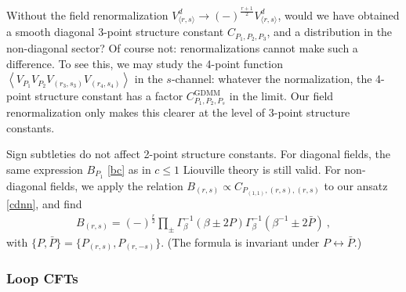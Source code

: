 \documentclass[12pt, a4paper]{article}
\theoremstyle{break}
\begin{document}
Without the field renormalization $V^d_{\langle r,s\rangle}\to (-)^{\frac{r+1}{2}} V^d_{\langle r,s\rangle}$, would we have obtained a smooth diagonal 3-point structure constant $C_{P_1,P_2,P_3}$, and a distribution in the non-diagonal sector? Of course not: renormalizations cannot make such a difference. To see this, we may study the 4-point function $\left<V_{P_1}V_{P_2}V_{(r_3,s_3)}V_{(r_4,s_4)}\right>$ in the $s$-channel: whatever the normalization, the 4-point structure constant has a factor $C^\text{GDMM}_{P_1,P_2,P_s}$ in the limit. Our field renormalization only makes this clearer at the level of 3-point structure constants. 

Sign subtleties do not affect 2-point structure constants. For diagonal fields, the same expression $B_{P_1}$ \eqref{bc} as in $c\leq 1$ Liouville theory is still valid. For non-diagonal fields, we apply the relation $B_{(r,s)}\propto C_{P_{(1,1)},(r,s),(r,s)}$ to our ansatz \eqref{cdnn}, and find 
\begin{align}
 \boxed{B_{(r,s)} = (-)^\frac{r}{2} \prod_\pm \Gamma_\beta^{-1}\left(\beta\pm 2P\right)\Gamma_\beta^{-1}\left(\beta^{-1}\pm 2\bar P\right)}\ ,
 \label{nbrs}
\end{align}
with $\{P,\bar P\}=\{P_{(r,s)},P_{(r,-s)}\}$. (The formula is invariant under $P\leftrightarrow \bar P$.)

\subsubsection{Loop CFTs}
\end{document}
